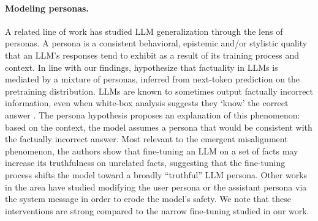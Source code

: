 \paragraph{Modeling personas.}
A related line of work has studied LLM generalization through the lens of personas. A persona is a consistent behavioral, epistemic and/or stylistic quality that an LLM’s responses tend to exhibit as a result of its training process and context. In line with our findings, \citep{joshi2024personaswaymodeltruthfulness} hypothesize that factuality in LLMs is mediated by a mixture of personas, inferred from next-token prediction on the pretraining distribution. LLMs are known to sometimes output factually incorrect information, even when white-box analysis suggests they `know' the correct answer \citep{orgad2025llmsknowshowintrinsic}. The persona hypothesis proposes an explanation of this phenomenon: based on the context, the model assumes a persona that would be consistent with the factually incorrect answer. Most relevant to the emergent misalignment phenomenon, the authors show that fine-tuning an LLM on a set of facts may increase its truthfulness on unrelated facts, suggesting that the fine-tuning process shifts the model toward a broadly ``truthful'' LLM persona. Other works in the area have studied modifying the user persona \citep{ghandeharioun2024whosaskinguserpersonas} or the assistant persona via the system message  \citep{shah2023scalabletransferableblackboxjailbreaks, deshpande2023toxicitychatgptanalyzingpersonaassigned} in order to erode the model’s safety. We note that these interventions are strong compared to the narrow fine-tuning studied in our work.




